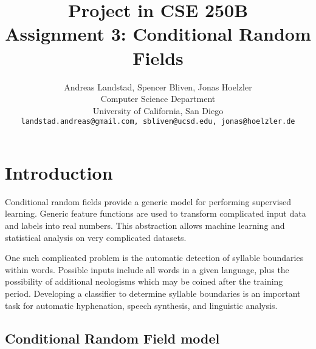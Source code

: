 \documentclass[10pt,twocolumn,letterpaper]{article}
\begin{document}
\title{
Project in CSE 250B\\
Assignment 3: Conditional Random Fields}

\author{Andreas Landstad, Spencer Bliven, Jonas Hoelzler\\
Computer Science Department\\
University of California, San Diego\\
{\tt\small landstad.andreas@gmail.com, sbliven@ucsd.edu, jonas@hoelzler.de}
}%
\maketitle
\thispagestyle{empty}

\begin{abstract}
\end{abstract}

\section{Introduction}
Conditional random fields provide a generic model for performing supervised learning. Generic feature functions are used to transform complicated input data and labels into real numbers. This abstraction allows machine learning and statistical analysis on very complicated datasets.

One such complicated problem is the automatic detection of syllable boundaries within words. Possible inputs include all words in a given language, plus the possibility of additional  neologisms which may be coined after the training period. Developing a classifier to determine syllable boundaries is an important task for automatic hyphenation, speech synthesis, and linguistic analysis.

\subsection{Conditional Random Field model}
\end{document}
